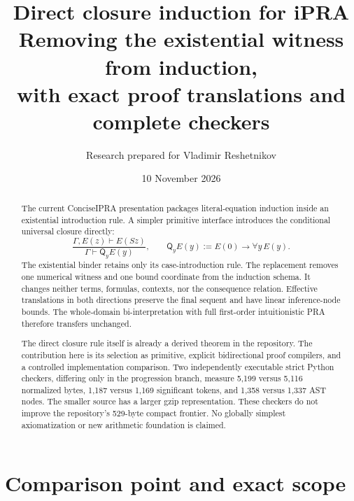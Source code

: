 \documentclass[11pt,letterpaper]{article}
\title{\color{ink}\bfseries Direct closure induction for iPRA\\[8pt]
\large Removing the existential witness from induction,\\with exact proof translations and complete checkers}
\author{Research prepared for Vladimir Reshetnikov}
\date{10 November 2026}
\theoremstyle{definition}\newtheorem{definition}[theorem]{Definition}
\theoremstyle{remark}\newtheorem{remark}[theorem]{Remark}
\newcommand{\Q}{\mathsf Q}
\begin{document}
\maketitle
\begin{abstract}
The current ConciseIPRA presentation packages literal-equation induction
inside an existential introduction rule. A simpler primitive interface
introduces the conditional universal closure directly:
\[
 \frac{\Gamma,E(z)\vdash E(Sz)}{\Gamma\vdash\Q_yE(y)},
 \qquad \Q_yE(y):=E(0)\to\forall y\,E(y).
\]
The existential binder retains only its case-introduction rule. The
replacement removes one numerical witness and one bound coordinate from
the induction schema. It changes neither terms, formulas, contexts, nor
the consequence relation. Effective translations in both directions
preserve the final sequent and have linear inference-node bounds. The
whole-domain bi-interpretation with full first-order intuitionistic PRA
therefore transfers unchanged.

The direct closure rule itself is already a derived theorem in the
repository. The contribution here is its selection as primitive, explicit
bidirectional proof compilers, and a controlled implementation comparison.
Two independently executable strict Python checkers, differing only in
the progression branch, measure 5,199 versus 5,116 normalized bytes,
1,187 versus 1,169 significant tokens, and 1,358 versus 1,337 AST nodes.
The smaller source has a larger gzip representation. These checkers do
not improve the repository's 529-byte compact frontier. No globally
simplest axiomatization or new arithmetic foundation is claimed.
\end{abstract}
\begin{center}
\end{center}
\clearpage
\setcounter{tocdepth}{1}
\begingroup\small\setlength{\parskip}{0pt}\tableofcontents\endgroup
\clearpage

\section{Comparison point and exact scope}
\end{document}
